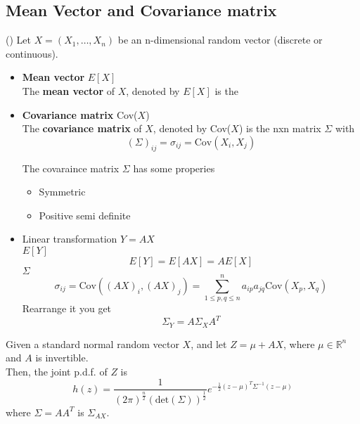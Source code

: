 \subsection*{Mean Vector and Covariance matrix}
(\cite*{Und_Chatterjee})
Let \(X = (X_1, \dots, X_n)\) be an n-dimensional random vector (discrete or continuous). 
\begin{itemize}
    \item \textbf{Mean vector} \(E[X]\)\\
    The \textbf{mean vector} of  \(X\), denoted by \(E[X]\) is the  
    \item \textbf{Covariance matrix} Cov(\(X\))\\
    The \textbf{covariance matrix} of \(X\), denoted by Cov(\(X\)) is the nxn matrix \(\Sigma\) with 
    \[
        (\Sigma )_{ij} = \sigma_{ij} = \text{Cov} (X_i,X_j)
    \]   

    \begin{remark}
        The covaraince matrix \(\Sigma \) has some properies  
        \begin{itemize}
            \item Symmetric
            \item Positive semi definite
        \end{itemize}
    \end{remark}
    \item Linear transformation \(Y = AX\)\\ 
    \(E[Y]\) 
    \[
        E[Y]  = E[AX] = AE[X]
    \]
    \(\Sigma \) 
    \[
        \sigma_{ij} =  \text{Cov} ((AX)_i, (AX)_{j} ) = \sum_{1\leq p,q \leq n}^{n} a_{ip}a_{jq} \text{Cov}(X_{p} ,X_{q} ) 
    \]
    Rearrange it you get 
    \[
        \Sigma_Y = A \Sigma_X A^T
    \] 
\end{itemize}
\begin{theorem}
    Given a standard normal random vector \(X\), and let \(Z = \mu  + AX\), where \(\mu \in \mathbb{R}^n\) and \(A\) is invertible. 
    \\Then, the joint p.d.f. of \(Z\) is 
    \[
        h(z) = \frac{1}{(2\pi)^{\frac{n}{2}} (\text{det}(\Sigma) )^{\frac{1}{2}}} e^{-\frac{1}{2} (z-\mu )^T \Sigma ^{-1} (z-\mu ) }
    \]     
    where \(\Sigma  = A A^T\) is \(\Sigma_{AX} \). 
\end{theorem}


